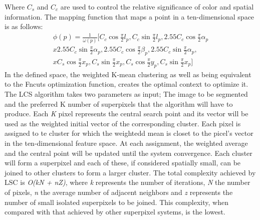 Where $ C_s $ and $ C_c $ are used to control the relative significance of
color and spatial information. The mapping function that maps a point in a ten-dimensional
space is as follows:
\begin{equation}
    \begin{split}
        \phi(p) = \frac{1}{\omega(p)}[C_c\cos\frac{\pi}{2}l_p, C_c\sin\frac{\pi}{2}l_p, 2.55C_c\cos\frac{\pi}{2}\alpha_p \\
        x 2.55C_c\sin\frac{\pi}{2}\alpha_p, 2.55C_c\cos\frac{\pi}{2}\beta_p, 2.55C_c\sin\frac{\pi}{2}\alpha_p, \\
        x C_s\cos\frac{\pi}{2}x_p, C_s\sin\frac{\pi}{2}x_p, C_s\cos\frac{\pi}{2}y_p, C_s\sin\frac{\pi}{2}x_p]
    \end{split}
\end{equation}
In the defined space, the weighted K-mean clustering as well as being 
equivalent to the Fncuts optimization function, creates the optimal context to 
optimize it. The LCS algorithm takes two parameters as input; The image 
to be segmented and the preferred K number of superpixels that the 
algorithm will have to produce. Each \emph{K} pixel represents the central search point 
and its vector will be used as the weighted initial vector of the corresponding 
cluster. Each pixel is assigned to te cluster for which the weightedd mean 
is closet to the picel's vector in the ten-dimensional feature space. At each 
assignment, the weighted average and the central point will be updated until 
the system convergence. Each cluster will form a superpixel and each of 
these, if considered spatially small, can be joined to other clusters to form 
a larger cluster. The total complexity achieved by LSC is \emph{O(kN + nZ)}, where 
\emph{k} represents the number of iterations, \emph{N} the number of pixels, \emph{n} the average 
number of adjacent neighbors and \emph{z} represents the number of small 
isolated superpixels to be joined. This complexity, when compared with that 
achieved by other superpixel systems, is the lowest.

